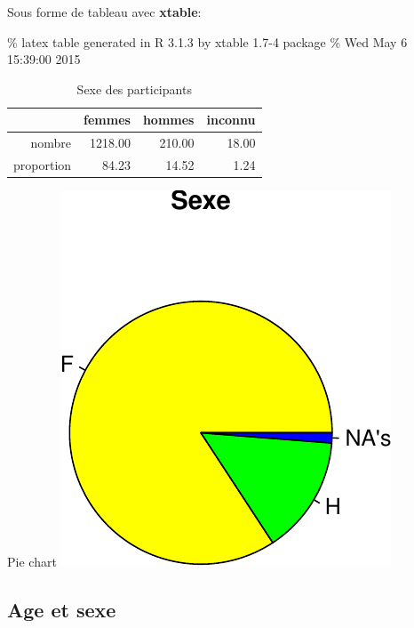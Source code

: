 \documentclass[]{article}
\begin{document}
Sous forme de tableau avec \textbf{xtable}:

\% latex table generated in R 3.1.3 by xtable 1.7-4 package \% Wed May 6
15:39:00 2015

\begin{table}[ht]
\centering
\begin{tabular}{rrrr}
  \hline
 & femmes & hommes & inconnu \\ 
  \hline
nombre & 1218.00 & 210.00 & 18.00 \\ 
  proportion & 84.23 & 14.52 & 1.24 \\ 
   \hline
\end{tabular}
\caption{Sexe des participants} 
\label{sexe}
\end{table}

Pie chart
\includegraphics{qs_etudiants_files/figure-latex/pie_sexe-1.pdf}

\subsection{Age et sexe}\label{age-et-sexe}
\end{document}
